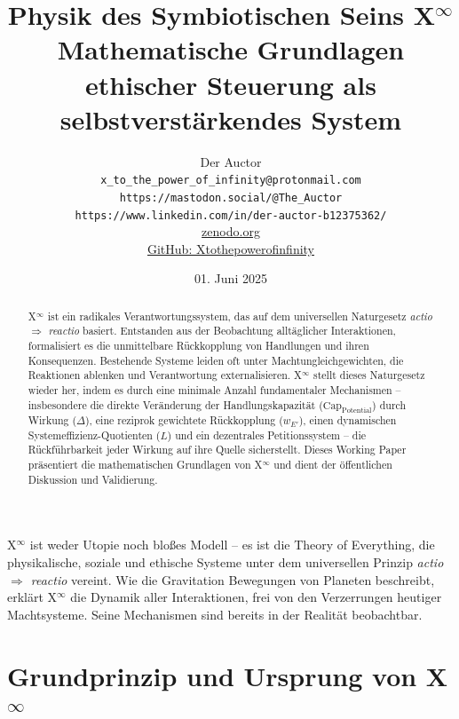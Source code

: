 \documentclass[12pt]{scrartcl}
\title{\texorpdfstring{Physik des Symbiotischen Seins X$^\infty$}{Physik im Symbiotischen Sein X-Unendlich}\\Mathematische Grundlagen ethischer Steuerung als selbstverstärkendes System}
\author{Der Auctor \\
\texttt{x\_to\_the\_power\_of\_infinity@protonmail.com} \\
\texttt{https://mastodon.social/@The\_Auctor} \\
\texttt{https://www.linkedin.com/in/der-auctor-b12375362/} \\
\href{https://zenodo.org/communities/xtothepowerofinfinity/}{zenodo.org} \\
\href{https://github.com/Xtothepowerofinfinity/Philosophie_der_Verantwortung}{GitHub: Xtothepowerofinfinity}
}
\date{01. Juni 2025}
\begin{document}
\maketitle
X$^\infty$ ist weder Utopie noch bloßes Modell – es ist die Theory of Everything, die physikalische, soziale und ethische Systeme unter dem universellen Prinzip \emph{actio $\Rightarrow$ reactio} vereint. Wie die Gravitation Bewegungen von Planeten beschreibt, erklärt X$^\infty$ die Dynamik aller Interaktionen, frei von den Verzerrungen heutiger Machtsysteme. Seine Mechanismen sind bereits in der Realität beobachtbar.

\clearpage

\begin{abstract}
X$^\infty$ ist ein radikales Verantwortungssystem, das auf dem universellen Naturgesetz \emph{actio $\Rightarrow$ reactio} basiert. Entstanden aus der Beobachtung alltäglicher Interaktionen, formalisiert es die unmittelbare Rückkopplung von Handlungen und ihren Konsequenzen. Bestehende Systeme leiden oft unter Machtungleichgewichten, die Reaktionen ablenken und Verantwortung externalisieren. X$^\infty$ stellt dieses Naturgesetz wieder her, indem es durch eine minimale Anzahl fundamentaler Mechanismen – insbesondere die direkte Veränderung der Handlungskapazität ($\text{Cap}_{\text{Potential}}$) durch Wirkung ($\Delta$), eine reziprok gewichtete Rückkopplung ($w_{E'}$), einen dynamischen Systemeffizienz-Quotienten ($L$) und ein dezentrales Petitionssystem – die Rückführbarkeit jeder Wirkung auf ihre Quelle sicherstellt. Dieses Working Paper präsentiert die mathematischen Grundlagen von X$^\infty$ und dient der öffentlichen Diskussion und Validierung.
\end{abstract}

\clearpage
\tableofcontents
\clearpage

\section{Grundprinzip und Ursprung von \texorpdfstring{X$^\infty$}{X-Unendlich}}
\label{sec:Grundprinzip}
\end{document}
